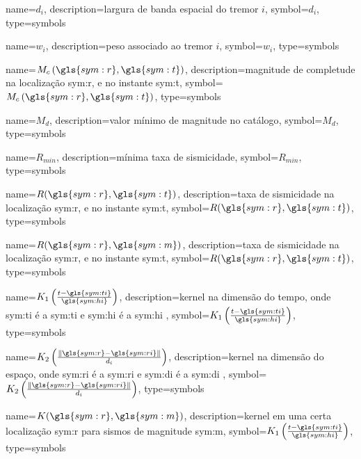 {
	name={\ensuremath{d_i}},
	description={largura de banda espacial do tremor $i$},
	symbol={\ensuremath{d_i}},
	type=symbols
}


{
	name={\ensuremath{ w_i }},
	description={peso associado ao tremor $i$},
	symbol={\ensuremath{ w_i }},
	type=symbols
}


{
	name={\ensuremath{ M_c\left( \gls{sym:r}, \gls{sym:t} \right)  }},
	description={magnitude de completude na localização \gls{sym:r}, e no instante \gls{sym:t}},
	symbol={\ensuremath{ M_c\left( \gls{sym:r}, \gls{sym:t} \right) }},
	type=symbols
}

{
	name={\ensuremath{M_d}},
	description={valor mínimo de magnitude no catálogo},
	symbol={\ensuremath{M_d}},
	type=symbols
}


{
	name={\ensuremath{R_{min}}},
	description={mínima taxa de sismicidade},
	symbol={\ensuremath{R_{min}}},
	type=symbols
}


{
	name={\ensuremath{R(\gls{sym:r},\gls{sym:t})}},
	description={taxa de sismicidade na localização \gls{sym:r}, e no instante \gls{sym:t}},
	symbol={\ensuremath{R(\gls{sym:r},\gls{sym:t})}},
	type=symbols
}


{
	name={\ensuremath{R(\gls{sym:r},\gls{sym:m})}},
	description={taxa de sismicidade na localização \gls{sym:r}, e no instante \gls{sym:t}},
	symbol={\ensuremath{R(\gls{sym:r},\gls{sym:t})}},
	type=symbols
}


{
	name={\ensuremath{K_1 \left( \frac{ t - \gls{sym:ti} }{ \gls{sym:hi} } \right) }},
	description={kernel na dimensão do tempo, onde
					\gls{sym:ti} é a \glsdesc{sym:ti} e
					\gls{sym:hi} é a \glsdesc{sym:hi}
				},
	symbol={\ensuremath{K_1 \left( \frac{ t - \gls{sym:ti} }{ \gls{sym:hi} } \right)}},
	type=symbols
}

{
	name={\ensuremath{K_2 \left( \frac{ \| \gls{sym:r} - \gls{sym:ri} \| }{d_i} \right) }},
	description={kernel na dimensão do espaço, onde
					\gls{sym:ri} é a \glsdesc{sym:ri} e
					\gls{sym:di} é a \glsdesc{sym:di}
	},
	symbol={\ensuremath{K_2 \left( \frac{ \| \gls{sym:r} - \gls{sym:ri} \| }{d_i} \right)}},
	type=symbols
}


{
	name={\ensuremath{K(\gls{sym:r},\gls{sym:m})}},
	description={kernel em uma certa localização \gls{sym:r} para sismos de magnitude \gls{sym:m}},
	symbol={\ensuremath{K_1 \left( \frac{ t - \gls{sym:ti} }{ \gls{sym:hi} } \right)}},
	type=symbols
}

